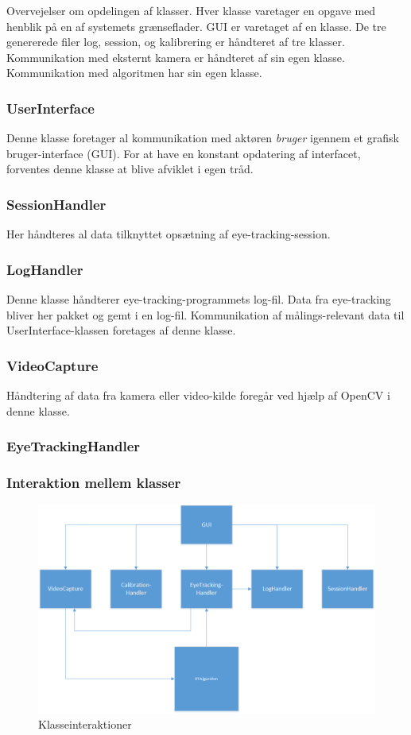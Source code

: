 \documentclass[rapport.tex]{subfiles}
\begin{document}
	Overvejelser om opdelingen af klasser. Hver klasse varetager en opgave med henblik på en af systemets grænseflader. GUI er varetaget af en klasse. De tre genererede filer log, session, og kalibrering er håndteret af tre klasser. Kommunikation med eksternt kamera er håndteret af sin egen klasse. Kommunikation med algoritmen har sin egen klasse. 
		\subsubsection{UserInterface}
		Denne klasse foretager al kommunikation med aktøren \textit{bruger} igennem et grafisk bruger-interface (GUI). For at have en konstant opdatering af interfacet, forventes denne klasse at blive afviklet i egen tråd. 
	
		
		\subsubsection{SessionHandler}
		Her håndteres al data tilknyttet opsætning af eye-tracking-session. 
		\subsubsection{LogHandler}
		Denne klasse håndterer eye-tracking-programmets log-fil. Data fra eye-tracking bliver her pakket og gemt i en log-fil. Kommunikation af målings-relevant data til UserInterface-klassen foretages af denne klasse.
		\subsubsection{VideoCapture}
		Håndtering af data fra kamera eller video-kilde foregår ved hjælp af OpenCV i denne klasse. 
		\subsubsection{EyeTrackingHandler}
	 
		
		\subsubsection{Interaktion mellem klasser}
		
		\begin{figure}
		\centering
		\includegraphics[width=0.9\linewidth]{klasseinteraktion}
		\caption{Klasseinteraktioner}
		\label{fig:klasseinteraktion}
		\end{figure}
\end{document}
